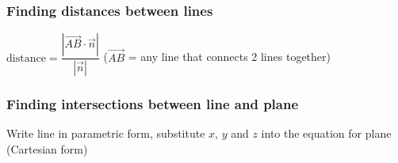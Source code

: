 \subsubsection{Finding distances between lines}
$\text{distance}=\dfrac{|\overrightarrow{AB}\cdot\vec{n}|}{|\vec{n}|}$ ($\overrightarrow{AB}$ = any line that connects 2 lines together)
\subsubsection{Finding intersections between line and plane}
Write line in parametric form, substitute $x$, $y$ and $z$ into the equation for plane (Cartesian form)